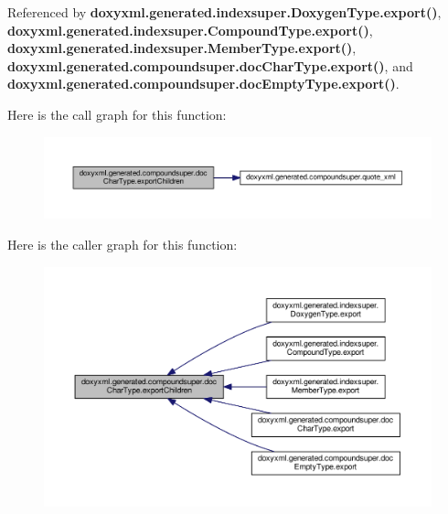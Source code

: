 Referenced by {\bf doxyxml.\+generated.\+indexsuper.\+Doxygen\+Type.\+export()}, {\bf doxyxml.\+generated.\+indexsuper.\+Compound\+Type.\+export()}, {\bf doxyxml.\+generated.\+indexsuper.\+Member\+Type.\+export()}, {\bf doxyxml.\+generated.\+compoundsuper.\+doc\+Char\+Type.\+export()}, and {\bf doxyxml.\+generated.\+compoundsuper.\+doc\+Empty\+Type.\+export()}.



Here is the call graph for this function\+:
\nopagebreak
\begin{figure}[H]
\begin{center}
\leavevmode
\includegraphics[width=350pt]{d3/dba/classdoxyxml_1_1generated_1_1compoundsuper_1_1docCharType_ae40ecddb318295498c569d4a7e405864_cgraph}
\end{center}
\end{figure}




Here is the caller graph for this function\+:
\nopagebreak
\begin{figure}[H]
\begin{center}
\leavevmode
\includegraphics[width=350pt]{d3/dba/classdoxyxml_1_1generated_1_1compoundsuper_1_1docCharType_ae40ecddb318295498c569d4a7e405864_icgraph}
\end{center}
\end{figure}


